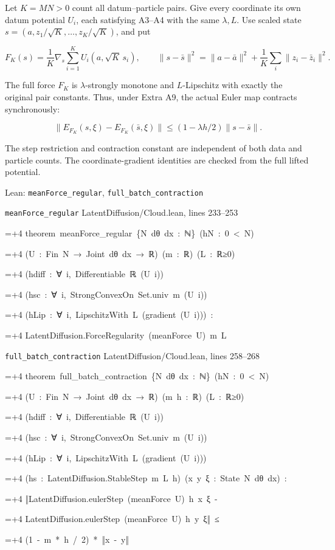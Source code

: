 \documentclass[11pt,a4paper]{report}
\newlength{\leancharwidth}
\newenvironment{leancode}{\par\smallskip\begingroup\ttfamily\footnotesize\raggedright
  \settowidth{\leancharwidth}{M}\setlength{\parskip}{0pt}\setlength{\parindent}{0pt}
  \frenchspacing}{\par\endgroup\smallskip}
\newcommand{\leanline}[2]{\hangindent=\dimexpr#1\leancharwidth+4\leancharwidth\relax
  \hangafter=1\noindent\hspace*{#1\leancharwidth}#2\par}
\newcommand{\leansource}[1]{\par{\footnotesize\color{leanmuted}#1}\par}
\begin{document}
Let \(K=MN>0\) count all datum–particle pairs. Give every coordinate its own datum potential \(U_i\), each satisfying A3–A4 with the same \(\lambda,L\). Use scaled state \(s=(a,z_1/\sqrt K,\ldots,z_K/\sqrt K)\), and put



\[F_K(s)=\frac1K\nabla_s\sum_{i=1}^K U_i(a,\sqrt K\,s_i),\qquad\|s-\bar s\|^2=\|a-\bar a\|^2+\frac1K\sum_i\|z_i-\bar z_i\|^2.\]



The full force \(F_K\) is \(\lambda\)-strongly monotone and \(L\)-Lipschitz with exactly the original pair constants. Thus, under Extra A9, the actual Euler map contracts synchronously:



\[\|E_{F_K}(s,\xi)-E_{F_K}(\bar s,\xi)\|\le(1-\lambda h/2)\|s-\bar s\|.\]



The step restriction and contraction constant are independent of both data and particle counts. The coordinate-gradient identities are checked from the full lifted potential.

\begin{leanbox}{Lean: \texttt{meanForce\_\allowbreak{}regular}, \texttt{full\_\allowbreak{}batch\_\allowbreak{}contraction}}
\leansource{\texttt{meanForce\_\allowbreak{}regular} \quad LatentDiffusion/\allowbreak{}Cloud.lean, lines 233–253}
\begin{leancode}
\leanline{0}{theorem\ meanForce\_regular\ \{N\ dθ\ dx\ :\ ℕ\}\ (hN\ :\ 0\ <\ N)}
\leanline{4}{(U\ :\ Fin\ N\ →\ Joint\ dθ\ dx\ →\ ℝ)\ (m\ :\ ℝ)\ (L\ :\ ℝ≥0)}
\leanline{4}{(hdiff\ :\ ∀\ i,\ Differentiable\ ℝ\ (U\ i))}
\leanline{4}{(hsc\ :\ ∀\ i,\ StrongConvexOn\ Set.univ\ m\ (U\ i))}
\leanline{4}{(hLip\ :\ ∀\ i,\ LipschitzWith\ L\ (gradient\ (U\ i)))\ :}
\leanline{4}{LatentDiffusion.ForceRegularity\ (meanForce\ U)\ m\ L}
\end{leancode}
\leansource{\texttt{full\_\allowbreak{}batch\_\allowbreak{}contraction} \quad LatentDiffusion/\allowbreak{}Cloud.lean, lines 258–268}
\begin{leancode}
\leanline{0}{theorem\ full\_batch\_contraction\ \{N\ dθ\ dx\ :\ ℕ\}\ (hN\ :\ 0\ <\ N)}
\leanline{4}{(U\ :\ Fin\ N\ →\ Joint\ dθ\ dx\ →\ ℝ)\ (m\ h\ :\ ℝ)\ (L\ :\ ℝ≥0)}
\leanline{4}{(hdiff\ :\ ∀\ i,\ Differentiable\ ℝ\ (U\ i))}
\leanline{4}{(hsc\ :\ ∀\ i,\ StrongConvexOn\ Set.univ\ m\ (U\ i))}
\leanline{4}{(hLip\ :\ ∀\ i,\ LipschitzWith\ L\ (gradient\ (U\ i)))}
\leanline{4}{(hs\ :\ LatentDiffusion.StableStep\ m\ L\ h)\ (x\ y\ ξ\ :\ State\ N\ dθ\ dx)\ :}
\leanline{4}{‖LatentDiffusion.eulerStep\ (meanForce\ U)\ h\ x\ ξ\ -}
\leanline{6}{LatentDiffusion.eulerStep\ (meanForce\ U)\ h\ y\ ξ‖\ ≤}
\leanline{8}{(1\ -\ m\ *\ h\ /\ 2)\ *\ ‖x\ -\ y‖}
\end{leancode}
\end{leanbox}
\end{document}
